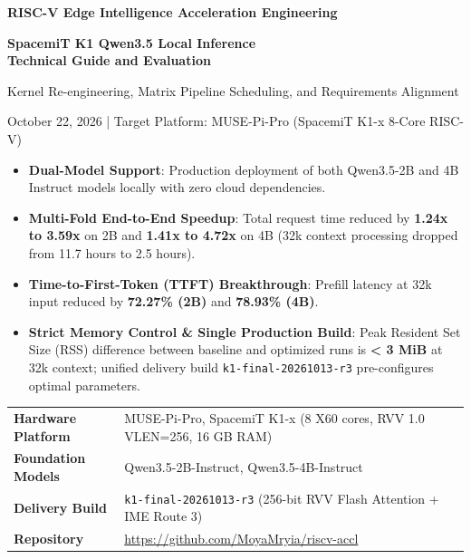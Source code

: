 \documentclass[10pt,a4paper]{article}
\begin{document}
\begin{titlepage}
\vspace*{10mm}
{\large\textcolor{primary}{\textbf{RISC-V Edge Intelligence Acceleration Engineering}}}\par
\vspace{8mm}
{\Huge\bfseries\color{primary} SpacemiT K1 Qwen3.5 Local Inference\\[4pt]Technical Guide and Evaluation\par}
\vspace{6mm}
{\Large\color{secondary} Kernel Re-engineering, Matrix Pipeline Scheduling, and Requirements Alignment\par}
\vspace{8mm}
{\large October 22, 2026 | Target Platform: MUSE-Pi-Pro (SpacemiT K1-x 8-Core RISC-V)\par}
\vspace{10mm}

\begin{tcolorbox}[colback=lightgray,colframe=primary,arc=3mm,title=\textbf{Executive Summary}]
\begin{itemize}
  \item \textbf{Dual-Model Support}: Production deployment of both Qwen3.5-2B and 4B Instruct models locally with zero cloud dependencies.
  \item \textbf{Multi-Fold End-to-End Speedup}: Total request time reduced by \textbf{1.24x to 3.59x} on 2B and \textbf{1.41x to 4.72x} on 4B (32k context processing dropped from 11.7 hours to 2.5 hours).
  \item \textbf{Time-to-First-Token (TTFT) Breakthrough}: Prefill latency at 32k input reduced by \textbf{72.27\% (2B)} and \textbf{78.93\% (4B)}.
  \item \textbf{Strict Memory Control \& Single Production Build}: Peak Resident Set Size (RSS) difference between baseline and optimized runs is \textbf{< 3 MiB} at 32k context; unified delivery build \texttt{k1-final-20261013-r3} pre-configures optimal parameters.
\end{itemize}
\end{tcolorbox}

\vfill
\begin{tabular}{@{}ll@{}}
\textbf{Hardware Platform} & MUSE-Pi-Pro, SpacemiT K1-x (8 X60 cores, RVV 1.0 VLEN=256, 16 GB RAM) \\
\textbf{Foundation Models} & Qwen3.5-2B-Instruct, Qwen3.5-4B-Instruct \\
\textbf{Delivery Build} & \texttt{k1-final-20261013-r3} (256-bit RVV Flash Attention + IME Route 3) \\
\textbf{Repository} & \url{https://github.com/MoyaMryia/riscv-accl} \\
\end{tabular}
\vspace{6mm}
\end{titlepage}
\end{document}
